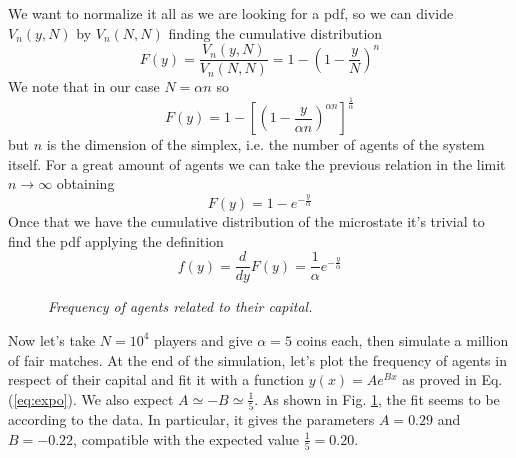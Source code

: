 We want to normalize it all as we are looking for a pdf, so we can divide $V_n\left(y, N\right)$ by $V_n\left(N, N\right)$ finding the cumulative distribution
\begin{equation*}
    F(y) = \frac{V_n\left(y, N\right)}{V_n\left(N, N\right)} = 1 - \left(1 - \frac{y}{N}\right)^n
\end{equation*}
We note that in our case $N=\alpha n$ so
\begin{equation*}
    F(y) =  1 - \left[\left(1 - \frac{y}{\alpha n}\right)^{\alpha n}\right]^\frac{1}{\alpha}
\end{equation*}
but $n$ is the dimension of the simplex, i.e. the number of agents of the system itself.
For a great amount of agents we can take the previous relation in the limit $n\to\infty$ obtaining
\begin{equation*}
    F(y) = 1 - e^{-\frac{y}{\alpha}}
\end{equation*}
Once that we have the cumulative distribution of the microstate it's trivial to find the pdf applying the definition
\begin{equation}
    f(y) = \frac{d}{dy}F(y) = \frac{1}{\alpha} e^{-\frac{y}{\alpha}}
    \label{eq:expo}
\end{equation}

\begin{figure}[ht!]
    \centering
    \scalebox{.7}{}
    \caption{\emph{Frequency of agents related to their capital.}}
    \label{fig:expo}
\end{figure}
Now let's take $N = 10^4$ players and give $\alpha = 5$ coins each, then simulate a million of fair matches.
At the end of the simulation, let's plot the frequency of agents in respect of their capital and fit \cite{root} it with a function $y(x) = Ae^{Bx}$ as proved in Eq. (\ref{eq:expo}).
We  also expect $A \simeq -B \simeq \frac{1}{5}$.
As shown in Fig. \ref{fig:expo}, the fit seems to be according to the data.
In particular, it gives the parameters $A = 0.29$ and $B = -0.22$, compatible with the expected value $\frac{1}{5} = 0.20$.

